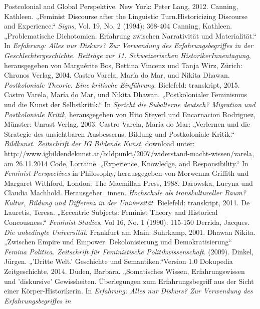 \documentclass[11pt]{article}
\begin{document}
\begin{thebibliography}{100}
{Postcolonial and Global Perspektive}. New York:
Peter Lang, 2012.
 Canning, Kathleen. „Feminist Discourse after the Linguistic Turn.Historicizing Discourse and
Experience.“ \emph{Signs}, Vol. 19, No. 2 (1994): 368-404
 Canning, Kathleen. „Problematische Dichotomien. Erfahrung zwischen Narrativität und
Materialität.“ In \emph{Erfahrung: Alles nur Diskurs? Zur Verwendung des
  Erfahrungsbegriffes in der Geschlechtergeschichte. Beiträge zur 11.
Schweizerischen HistorikerInnentagung}, herausgegeben von Marguérite Bos, Bettina Vincenz und Tanja Wirz, Zürich: Chronos Verlag, 2004.
 Castro Varela, María do Mar, und Nikita Dhawan. \emph{Postkoloniale Theorie. Eine kritische
Einführung}. Bielefeld: transkript, 2015.
 Castro Varela, María do Mar, und Nikita Dhawan. „Postkolonialer Feminismus und die Kunst der
Selbstkritik.“ In \emph{Spricht die Subalterne deutsch? Migration und
Postkoloniale Kritik},
herausgegeben von Hito Steyerl und Encarnacion Rodriguez, Münster: Unrast Verlag, 2003.
 Castro Varela, María do Mar: „Verlernen und die Strategie des unsichtbaren Ausbesserns. Bildung 
und Postkoloniale Kritik.“ \emph{Bildkunst. Zeitschrift der IG Bildende Kunst},
download unter:
\url{http://www.igbildendekunst.at/bildpunkt/2007/widerstand-macht-wissen/varela}, am 26.11.2014
 Code, Lorraine. „Experience, Knowledge, and Responsibility.“ In
\emph{Feminist Perspectives} in
Philosophy, herausgegeben von Morwenna Griffith und Margaret Withford, London: The Macmillan Press, 1988. 
 Darowska, Lucyna und Claudia Machhold. Herausgeber\_innen.
\emph{Hochschule als transkultureller
Raum? Kultur, Bildung und Differenz in der Universität}. Bielefeld: transkript, 2011. 
 De Lauretis, Teresa. „Eccentric Subjects: Feminist Theory
and Historical Concousness.“ \emph{Feminist Studies}, Vol 16, No. 1 (1990): 115-150 
 Derrida, Jacques. \emph{Die unbedingte Universität}. Frankfurt am Main: Suhrkamp, 2001.
 Dhawan Nikita. „Zwischen Empire und Empower. Dekolonisierung und Demokratisierung“ 
\emph{Femina Politica. Zeitschrift für Feministische Politikwissenschaft}. (2009).
 Dinkel, Jürgen. „'Dritte Welt.' Geschichte und Semantiken.“Version 1.0 Dokupedia Zeitgeschichte,
     2014. 
 Duden, Barbara. „Somatisches Wissen, Erfahrungswissen und 'diskursive' Gewissheiten.
Überlegungen zum Erfahrungsbegriff aus der Sicht einer Körper-Historikerin. In
\emph{Erfahrung: Alles nur Diskurs? Zur Verwendung des Erfahrungsbegriffes in
}
\end{thebibliography}
\end{document}
